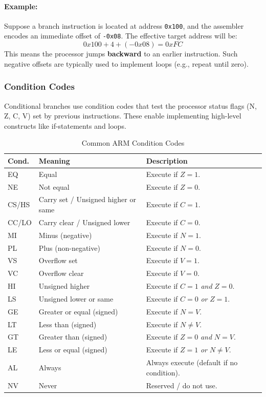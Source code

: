 \paragraph{Example:}  
Suppose a branch instruction is located at address \texttt{0x100}, and the assembler encodes an immediate offset of \texttt{-0x08}.  
The effective target address will be:
\[
0x100 + 4 + (-0x08) = 0xFC
\]
This means the processor jumps \textbf{backward} to an earlier instruction.  
Such negative offsets are typically used to implement loops (e.g., repeat until zero).

\subsubsection{Condition Codes}
Conditional branches use condition codes that test the processor status flags (N, Z, C, V) set by previous instructions. These enable implementing high-level constructs like if-statements and loops.

\begin{table}[H]
\centering
\caption{Common ARM Condition Codes}
\small
\begin{tabularx}{0.72\linewidth}{@{}l l X@{}}
\toprule
\textbf{Cond.} & \textbf{Meaning} & \textbf{Description} \\
\midrule
EQ  & Equal                     & Execute if $Z=1$. \\
NE  & Not equal                 & Execute if $Z=0$. \\
CS/HS & Carry set / Unsigned higher or same & Execute if $C=1$. \\
CC/LO & Carry clear / Unsigned lower        & Execute if $C=0$. \\
MI  & Minus (negative)          & Execute if $N=1$. \\
PL  & Plus (non-negative)       & Execute if $N=0$. \\
VS  & Overflow set              & Execute if $V=1$. \\
VC  & Overflow clear            & Execute if $V=0$. \\
HI  & Unsigned higher           & Execute if $C=1$ \emph{and} $Z=0$. \\
LS  & Unsigned lower or same    & Execute if $C=0$ \emph{or} $Z=1$. \\
GE  & Greater or equal (signed) & Execute if $N=V$. \\
LT  & Less than (signed)        & Execute if $N\neq V$. \\
GT  & Greater than (signed)     & Execute if $Z=0$ \emph{and} $N=V$. \\
LE  & Less or equal (signed)    & Execute if $Z=1$ \emph{or} $N\neq V$. \\
AL  & Always                    & Always execute (default if no condition). \\
NV  & Never                     & Reserved / do not use. \\
\bottomrule
\end{tabularx}
\end{table}

